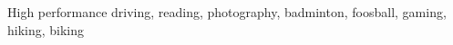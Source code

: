 

\begin{cvparagraph}
{High performance driving, reading, photography, badminton, foosball, gaming, hiking, biking}
\end{cvparagraph}
